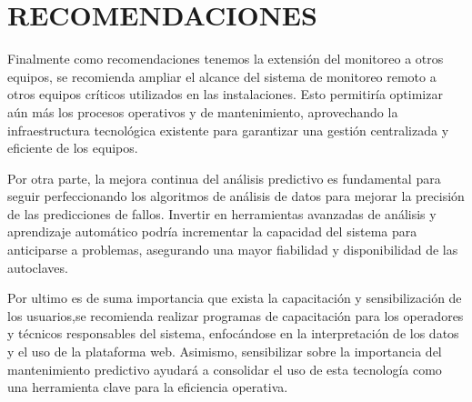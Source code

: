
\newpage
{} 

%
%

\section*{RECOMENDACIONES}
Finalmente como recomendaciones tenemos la extensión del monitoreo a otros equipos, se recomienda ampliar el alcance del sistema de monitoreo remoto a otros equipos críticos utilizados en las instalaciones. Esto permitiría optimizar aún más los procesos operativos y de mantenimiento, aprovechando la infraestructura tecnológica existente para garantizar una gestión centralizada y eficiente de los equipos.

Por otra parte, la mejora continua del análisis predictivo es fundamental para seguir perfeccionando los algoritmos de análisis de datos para mejorar la precisión de las predicciones de fallos. Invertir en herramientas avanzadas de análisis y aprendizaje automático podría incrementar la capacidad del sistema para anticiparse a problemas, asegurando una mayor fiabilidad y disponibilidad de las autoclaves.

Por ultimo es de suma importancia que exista la capacitación y sensibilización de los usuarios,se recomienda realizar programas de capacitación para los operadores y técnicos responsables del sistema, enfocándose en la interpretación de los datos y el uso de la plataforma web. Asimismo, sensibilizar sobre la importancia del mantenimiento predictivo ayudará a consolidar el uso de esta tecnología como una herramienta clave para la eficiencia operativa.

